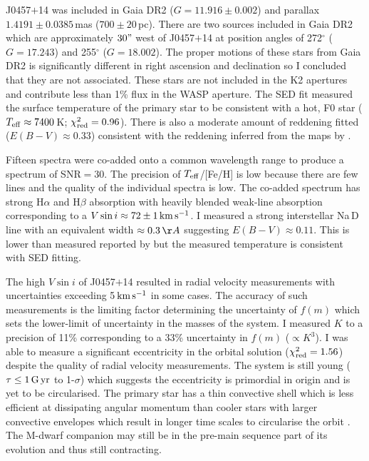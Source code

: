 J0457$+$14 was included in Gaia DR2 ($G = 11.916 \pm 0.002$) and parallax $1.4191 \pm 0.0385$\,mas ($700 \pm 20$\,pc). There are two sources included in Gaia DR2 which are approximately $30"$ west of J0457$+$14 at position angles of 272$^\circ$ ($G = 17.243$) and 255$^\circ$ ($G = 18.002$). The proper motions of these stars from Gaia DR2 is significantly different in right ascension and declination so I concluded that they are not associated. These stars are not included in the K2 apertures and contribute less than 1\% flux in the WASP aperture. The SED fit measured the surface temperature of the primary star to be consistent with a hot, F0 star ($T_{\rm eff} \approx 7400$\,K; $\chi^2_{\rm red} = 0.96$). There is also a moderate amount of reddening fitted ($E(B-V) \approx 0.33$) consistent with the reddening inferred from the maps by \citet{2011ApJ...737..103S}.

Fifteen spectra were co-added onto a common wavelength range to produce a spectrum of SNR$ = 30$. The precision of $T_{\rm eff}$/[Fe/H] is low because there are few lines and the quality of the individual spectra is low. The co-added spectrum has strong H$\alpha$ and H$\beta$ absorption with heavily blended weak-line absorption corresponding to a $V\sin i \approx 72 \pm 1\, \rm km\,\rm s^{-1}$. I measured a strong interstellar Na\,D line with an equivalent width $\approx 0.3\,\AA$ suggesting $E(B-V) \approx 0.11$. This is lower than measured reported by \citet{2011ApJ...737..103S} but the measured temperature is consistent with SED fitting.


The high $V \sin i$ of J0457$+$14 resulted in radial velocity measurements with uncertainties exceeding 5\,$\rm km\,s^{-1}$ in some cases. The accuracy of such measurements is the limiting factor determining the uncertainty of $f(m)$ which sets the lower-limit of uncertainty in the masses of the system. I measured $K$ to a precision of 11\% corresponding to a 33\% uncertainty in $f(m)$ ($\propto K^3$). I was able to measure a significant eccentricity in the orbital solution ($\chi^2_{\rm red} = 1.56$) despite the quality of radial velocity measurements. The system is still young ($\tau \leq 1\,\rm G\, \rm yr$ to 1-$\sigma$) which suggests the eccentricity is primordial in origin and is yet to be circularised. The primary star has a thin convective shell which is less efficient at dissipating angular momentum than cooler stars with larger convective envelopes which result in longer time scales to circularise the orbit \citep{2010A&ARv..18...67T}. The M-dwarf companion may still be in the pre-main sequence part of its evolution and thus still contracting.  




